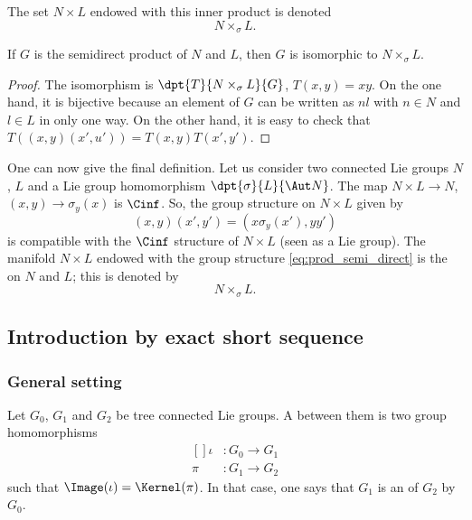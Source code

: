 The set $N\times L$ endowed with this inner product is denoted 
\[
   N\times_{\sigma}L.
\]

\begin{proposition}
If $G$ is the semidirect product of $N$ and $L$, then $G$ is isomorphic to $N\times_{\sigma} L$.
\end{proposition}

\begin{proof}
    The isomorphism is $\dpt{T}{N\times_{\sigma}L}{G}$, $T(x,y)=xy$. On the one hand, it is bijective because an element of $G$ can be written as $nl$ with $n\in N$ and $l\in L$ in only one way. On the other hand, it is easy to check that $T( (x,y)(x',u') )=T(x,y)T(x',y')$.
\end{proof}

One can now give the final definition. Let us consider two connected Lie groups $N$, $L$ and a Lie group  homomorphism $\dpt{\sigma}{L}{\Aut N}$. The map $N\times L\to N$, $(x,y)\to\sigma_y(x)$ is $\Cinf$. So, the group structure on $N\times L$ given by
\begin{equation}\label{eq:prod_semi_direct}
   (x,y)(x',y')=(x\sigma_y(x'),yy')
\end{equation}
is compatible with the $\Cinf$ structure of $N\times L$ (seen as a Lie group). The manifold $N\times L$ endowed with the group structure \eqref{eq:prod_semi_direct} is the  on $N$ and $L$; this is denoted by 
\[
   N\times_{\sigma}L.
\]

\subsection{Introduction by exact short sequence}

\subsubsection{General setting}

Let $G_0$, $G_1$ and $G_2$ be tree connected Lie groups. A  between them is two group homomorphisms
\begin{equation}
    \begin{aligned}[]
        \iota&\colon G_0\to G_1\\
        \pi&\colon G_1\to G_2
    \end{aligned}
\end{equation}
such that $\Image(\iota)=\Kernel(\pi)$. In that case, one says that $G_1$ is an  of $G_2$ by $G_0$.

